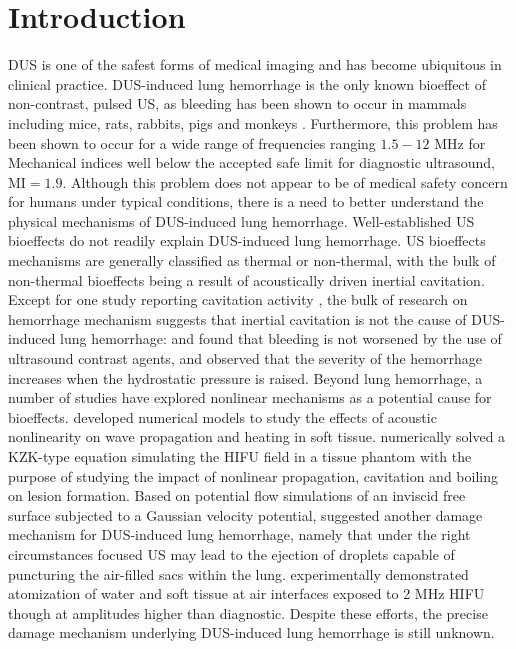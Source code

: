 \section{Introduction}%
\label{sec:introduction}%
\ac{DUS} is one of the safest forms of medical imaging and has become
ubiquitous in clinical practice. \ac{DUS}-induced lung hemorrhage is
the only known bioeffect of non-contrast, pulsed \ac{US}, as bleeding
has been shown to occur in mammals including mice, rats, rabbits,
pigs and monkeys
\citep{Child1990,OBrien2006a,Tarantal1994a,Miller2012}.  Furthermore,
this problem has been shown to occur for a wide range of frequencies
ranging $1.5-12$ MHz for Mechanical indices well below the accepted
safe limit for diagnostic ultrasound, $\mbox{MI}=1.9$. Although this problem
does not appear to be of medical safety concern for humans under
typical conditions, there is a need to better understand the physical
mechanisms of \ac{DUS}-induced lung hemorrhage.
Well-established \ac{US} bioeffects do not readily explain \ac{DUS}-induced
lung hemorrhage. \ac{US} bioeffects mechanisms are generally
classified as thermal or non-thermal, with the bulk of non-thermal
bioeffects being a result of acoustically driven inertial
cavitation. Except for one study reporting cavitation activity
\citep{Holland1996}, the bulk of research on hemorrhage mechanism
suggests that inertial cavitation is not the cause of \ac{DUS}-induced
lung hemorrhage: \cite{Raeman1996} and \cite{OBrien2004} found that
bleeding is not worsened by the use of ultrasound contrast agents,
and \cite{OBrien2000} observed that the severity of the hemorrhage
increases when the hydrostatic pressure is raised.
Beyond lung hemorrhage, a number of studies have explored nonlinear mechanisms as a potential
cause for bioeffects. \cite{Filonenko2001} developed numerical models
to study the effects of acoustic nonlinearity on wave propagation and
heating in soft tissue. \cite{Khokhlova2006} numerically solved a
KZK-type equation simulating the \ac{HIFU} field in a tissue phantom
with the purpose of studying the impact of nonlinear propagation,
cavitation and boiling on lesion formation. Based on potential flow
simulations of an inviscid free surface subjected to a Gaussian
velocity potential, \cite{Tjan2007} suggested another damage mechanism
for \ac{DUS}-induced lung hemorrhage, namely that under the right circumstances focused \ac{US} may
lead to the ejection of droplets capable of puncturing the air-filled
sacs within the lung. \cite{Simon2012}
experimentally demonstrated atomization of water and soft tissue at
air interfaces exposed to 2 MHz \ac{HIFU} though at amplitudes higher than diagnostic. Despite these efforts, the precise
damage mechanism underlying \ac{DUS}-induced lung hemorrhage is still
unknown.

